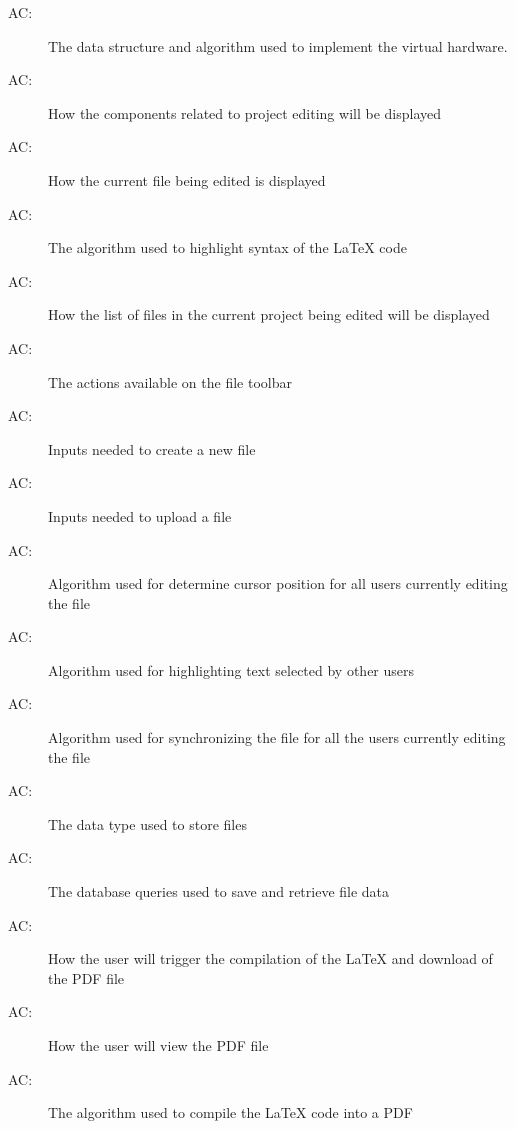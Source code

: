 \documentclass[12pt, titlepage]{article}
\newcounter{acnum}
\newcommand{\actheacnum}{AC\theacnum}
\begin{document}
	\begin{description}
		
		\item[ \actheacnum \label{ac1}:] The data structure and algorithm used to implement the virtual hardware.
		\item[ \actheacnum \label{ac2}:]  How the components related to project editing will be displayed
		\item[ \actheacnum \label{ac3}:]  How the current file being edited is displayed
		\item[ \actheacnum \label{ac4}:]  The algorithm used to highlight syntax of the LaTeX code
		\item[ \actheacnum \label{ac6}:]  How the list of files in the current project being edited will be displayed
		\item[ \actheacnum \label{ac7}:]  The actions available on the file toolbar
		\item[ \actheacnum \label{ac8}:]  Inputs needed to create a new file
		\item[ \actheacnum \label{ac9}:]  Inputs needed to upload a file
		\item[ \actheacnum \label{ac10}:]  Algorithm used for determine cursor position for all users currently editing the file
		\item[ \actheacnum \label{ac11}:]  Algorithm used for highlighting text selected by other users
		\item[ \actheacnum \label{ac12}:]  Algorithm used for synchronizing the file for all the users currently editing the file
		\item[ \actheacnum \label{ac13}:]  The data type used to store files
		\item[ \actheacnum \label{ac14}:]  The database queries used to save and retrieve file data
		\item[ \actheacnum \label{ac15}:]  How the user will trigger the compilation of the LaTeX and download of the PDF file
		\item[ \actheacnum \label{ac16}:]  How the user will view the PDF file
		\item[ \actheacnum \label{ac17}:]  The algorithm used to compile the LaTeX code into a PDF

\end{description}
\end{document}
